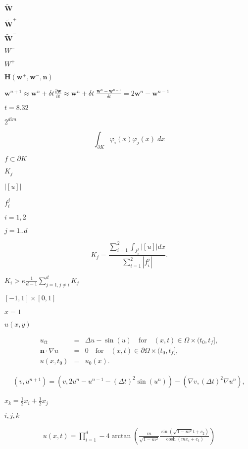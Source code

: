 \documentclass{article}
\begin{document}
$\tilde {\mathbf W}$
\pagebreak

$\tilde {\mathbf W}^+$
\pagebreak

$\tilde {\mathbf W}^-$
\pagebreak

$W^-$
\pagebreak

$W^+$
\pagebreak

$\mathbf H(\mathbf w^+,\mathbf w^-, \mathbf n)$
\pagebreak

$\mathbf w^{n+1}\approx \mathbf w^n + \delta t \frac{\partial \mathbf w}{\partial t} \approx \mathbf w^n + \delta t \; \frac{\mathbf w^n-\mathbf w^{n-1}}{\delta t} = 2 \mathbf w^n - \mathbf w^{n-1}$
\pagebreak

$t=8.32$
\pagebreak

$2^{dim}$
\pagebreak

\[ \int_{\partial K} \varphi_i(x) \varphi_j(x) \; dx \]
\pagebreak

$f\subset \partial K$
\pagebreak

$K_j$
\pagebreak

$|[u]|$
\pagebreak

$f_i^j$
\pagebreak

$i=1,2$
\pagebreak

$j=1..d$
\pagebreak

\[ K_j = \frac{\sum_{i=1}^2 \int_{f_i^j}|[u]| dx}{\sum_{i=1}^2 |f_i^j|} . \]
\pagebreak

$K_i > \kappa \frac 1{d-1} \sum_{j=1, j\neq i}^d K_j$
\pagebreak

$[-1,1]\times[0,1]$
\pagebreak

$x=1$
\pagebreak

$u(x,y)$
\pagebreak

\begin{eqnarray*} u_{tt} &=& \Delta u -\sin(u) \quad\mbox{for}\quad (x,t) \in \Omega \times (t_0,t_f],\\ {\mathbf n} \cdot \nabla u &=& 0 \quad\mbox{for}\quad (x,t) \in \partial\Omega \times (t_0,t_f],\\ u(x,t_0) &=& u_0(x). \end{eqnarray*}
\pagebreak

\begin{eqnarray*} (v,u^{n+1}) = (v,2 u^n-u^{n-1} - (\Delta t)^2 \sin(u^n)) - (\nabla v, (\Delta t)^2 \nabla u^n), \end{eqnarray*}
\pagebreak

$x_k = \frac 12 x_i + \frac 12 x_j$
\pagebreak

$i,j,k$
\pagebreak

\begin{eqnarray*} u(x,t) = \prod_{i=1}^{d} -4 \arctan \left( \frac{m}{\sqrt{1-m^2}}\frac{\sin\left(\sqrt{1-m^2} t +c_2\right)}{\cosh(mx_i+c_1)}\right) \end{eqnarray*}
\pagebreak
\end{document}
